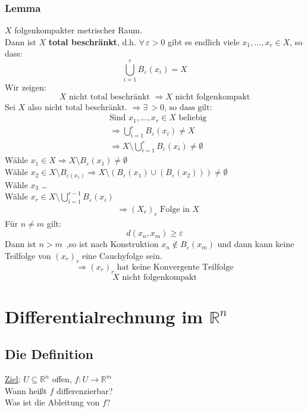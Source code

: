\subsubsection{Lemma} %
\label{ssub:lemma}
$X$ folgenkompakter metrischer Raum. \\
Dann ist $X$ {\bfseries total beschränkt}, d.h. $\forall\, \varepsilon>0$ gibt es endlich viele $x_1,\dots,x_r \in X$, so dass:
\[
	\bigcup\limits_{i=1}^r B_{\varepsilon}(x_i)=X
\]
 Wir zeigen: 
\[
	X \text{ nicht total beschränkt } \Rightarrow X \text{ nicht folgenkompakt}
\]
Sei $X$ also nicht total beschränkt. $\Rightarrow \exists\,>0 \text{, so dass gilt:}$
\begin{align*}
		&\text{Sind } x_1,\dots,x_r \in X \text{ beliebig} \\
		&\Rightarrow \bigcup\limits_{i=1}^rB_{\varepsilon}(x_i) \neq X \\
		&\Rightarrow X \setminus \bigcup\limits_{i=1}^rB_{\varepsilon}(x_i) \neq \emptyset
\end{align*}
Wähle $x_1 \in X \Rightarrow X \setminus B_{\varepsilon}(x_1) \neq \emptyset$ \\
Wähle $x_2 \in X \setminus B_{\varepsilon(x_1)} \Rightarrow X \setminus (B_{\varepsilon}(x_1)\cup(B_{\varepsilon}(x_2))) \neq \emptyset$ \\
Wähle $x_3$ \dots \\
Wähle $x_r \in X \setminus \bigcup\limits_{i=1}^{r-1}B_{\varepsilon}(x_i)$
\begin{align*}
	&\Rightarrow (X_r)_r \text{ Folge in }X 
\end{align*}	
	Für $n \neq m$ gilt: 
	$$d(x_n,x_m) \geq \varepsilon $$
	Dann ist $n>m$ \,,so ist nach Konstruktion  $x_n \notin B_{\varepsilon}(x_m)$ und 
	dann kann keine Teilfolge von $(x_r)_r$ eine Cauchyfolge sein.
 \[
 	\Rightarrow  (x_r)_r \text{ hat keine Konvergente Teilfolge} \]
	\[
		X \text{ nicht folgenkompakt}
	\]
\bewende


\newpage
\section{Differentialrechnung im $\mathbb{R}^n$} %
\label{sec:differentialrechnung_im_mathbb_r_n}

\subsection{Die Definition} %
\label{sub:die_definition}
\underline{Ziel}: $U \subseteq  \mathbb{R}^n$ offen, $f: U \to \mathbb{R}^m$ \\
Wann heißt $f$ differenzierbar? \\
Was ist die Ableitung von $f$? 
